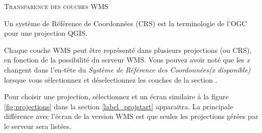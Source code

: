 \begin{Astuce}[ht]\caption{\textsc{Transparence des couches WMS}}
\end{Astuce}


Un syst\`eme de R\'ef\'erence de Coordonn\'ees (CRS) est la terminologie de l'OGC pour
une projection QGIS.

Chaque couche WMS peut \^etre repr\'esent\'e dans plusieurs projections (ou CRS), en
fonction de la possibilit\'e du serveur WMS. Vous pouvez avoir not\'e que les
\textsl{x} changent dans l'en-t\^ete du \textsl{Syst\`eme de R\'ef\'erence des
Coordonn\'ees(x disponible)} lorsque vous s\'electionnez et d\'eselectionnez les
couches de la section .

Pour choisir une projection, s\'electionnez  et un \'ecran
similaire \`a la figure \ref{fig:projections} dans la section
\ref{label_projstart} apparaitra. La principale diff\'erence avec l'\'ecran de la
version WMS est que seules les projections g\'er\'ees par le serveur sera list\'ees.

